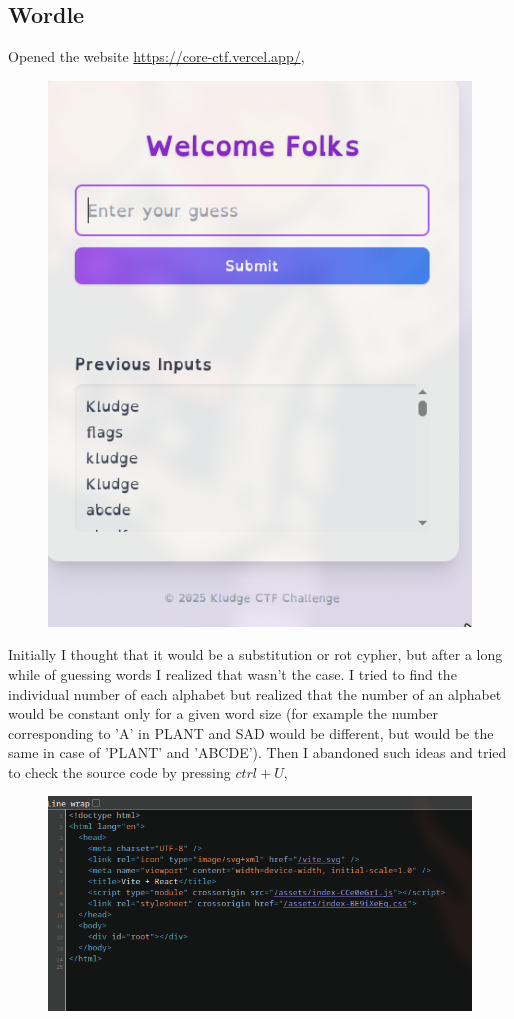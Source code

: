 \documentclass{article}
\begin{document}
\subsection{Wordle}
Opened the website \url{https://core-ctf.vercel.app/},
\begin{figure}[h!]
    \centering
    \includegraphics[width=0.5\linewidth]{figs/wordle1.png}
    \label{fig:enter-label}
\end{figure}
\pagebreak 
\newline Initially I thought that it would be a substitution or rot cypher, but after a long while of guessing words I realized that wasn't the case. I tried to find the individual number of each alphabet but realized that the number of an alphabet would be constant only for a given word size (for example the number corresponding to 'A' in PLANT and SAD would be different, but would be the same in case of 'PLANT' and 'ABCDE'). Then I abandoned such ideas and tried to check the source code by pressing $ctrl + U$, 
\begin{figure}[h!]
    \centering
    \includegraphics[width=1\linewidth]{figs/wordle2.png}
    \label{fig:enter-label}
\end{figure}
\end{document}
